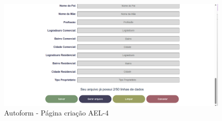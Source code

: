 \begin{figure}[htb]
    \caption{\label{fig:tela-ael4}Autoform - Página criação AEL-4}
    \begin{center}
        \includegraphics[scale=0.5]{imagens/autoform-ael-gerar4.png}
    \end{center}
\end{figure}

